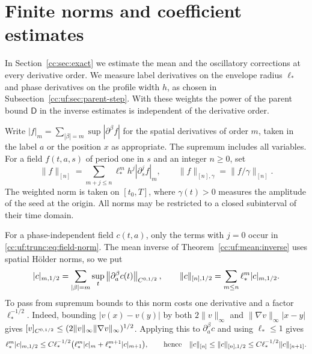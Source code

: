 \section{Finite norms and coefficient estimates}\label{cc:uf:finite:sec:calculus}
In Section~\ref{cc:sec:exact} we estimate the mean and the oscillatory
corrections at every derivative order. We measure label derivatives on
the envelope radius $\ell_*$ and phase derivatives on the profile width
$h$, as chosen in Subsection~\ref{cc:uf:sec:parent-step}.
With these weights the power of the parent bound $\mathsf D$ in the
inverse estimates is independent of the derivative order.

Write $|f|_m=\sum_{|\beta|=m}\sup|\partial^\beta f|$ for the spatial
derivatives of order $m$, taken in the label $a$ or the position $x$
as appropriate. The supremum includes all variables. For a field
$f(t,a,s)$ of period one in $s$ and an integer $n\ge0$, set
\begin{equation}\label{cc:uf:trunc:eq:field-norm}
 \|f\|_{[n]}=
 \sum_{m+j\le n}\ell_*^mh^j|\partial_s^jf|_m,
 \qquad \|f\|_{[n],\gamma}=\|f/\gamma\|_{[n]}.
\end{equation}
The weighted norm is taken on $[t_0,T]$, where $\gamma(t)>0$ measures
the amplitude of the seed at the origin. All norms may be restricted to a closed
subinterval of their time domain.

For a phase-independent field $c(t,a)$, only the terms with $j=0$
occur in \eqref{cc:uf:trunc:eq:field-norm}. The mean inverse of
Theorem~\ref{cc:uf:mean:inverse} uses spatial H\"older norms, so we put
\[
 |c|_{m,1/2}=\sum_{|\beta|=m}\sup_t\left\lVert\partial_a^\beta c(t)\right\rVert_{C^{0,1/2}},
 \qquad
 \|c\|_{[n],1/2}=\sum_{m\le n}\ell_*^m|c|_{m,1/2}.
\]
To pass from supremum bounds to this norm costs one derivative and a
factor $\ell_*^{-1/2}$. Indeed, bounding $|v(x)-v(y)|$ by both
$2\|v\|_\infty$ and $\|\nabla v\|_\infty|x-y|$ gives
$[v]_{C^{0,1/2}}\le(2\|v\|_\infty\|\nabla v\|_\infty)^{1/2}$.
Applying this to $\partial_a^\beta c$ and using $\ell_*\le1$ gives
\begin{equation}\label{cc:uf:trunc:eq:holder-sup}
 \ell_*^m|c|_{m,1/2}
 \le C\ell_*^{-1/2}\bigl(\ell_*^m|c|_m+\ell_*^{m+1}|c|_{m+1}\bigr),
 \qquad\hbox{hence}\quad
 \|c\|_{[n]}\le\|c\|_{[n],1/2}\le C\ell_*^{-1/2}\|c\|_{[n+1]} .
\end{equation}

